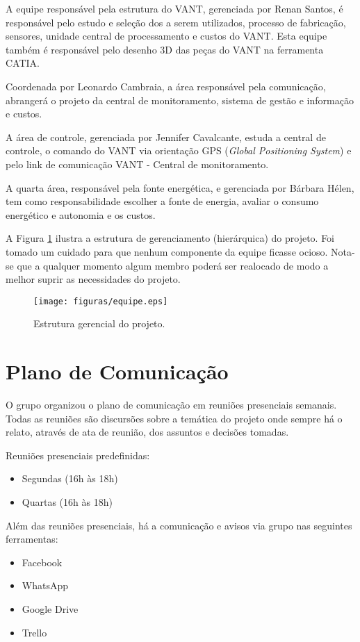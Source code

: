 A equipe responsável pela estrutura do VANT, gerenciada por Renan Santos, é responsável pelo estudo e seleção dos a serem utilizados, processo de fabricação, sensores, unidade central de processamento e custos do VANT. Esta equipe também é responsável pelo desenho 3D das peças do VANT na ferramenta CATIA.  
	
Coordenada por Leonardo Cambraia, a área responsável pela comunicação, abrangerá o projeto da central de monitoramento, sistema de gestão e informação e custos.
	
A área de controle, gerenciada por Jennifer Cavalcante, estuda a central de controle, o comando do VANT via orientação GPS (\textit{Global Positioning System}) e pelo link de comunicação VANT - Central de monitoramento.
	
A quarta área, responsável pela fonte energética, e gerenciada por Bárbara Hélen, tem como responsabilidade escolher a fonte de energia, avaliar o consumo energético e autonomia e os custos.
	
A Figura \ref{fig:equipe} ilustra a estrutura de gerenciamento (hierárquica) do projeto. Foi tomado um cuidado para que nenhum componente da equipe ficasse ocioso. Nota-se que a qualquer momento algum membro poderá ser realocado de modo a melhor suprir as necessidades do projeto.

\begin{figure}[H]
	\centering
		\texttt{[image: figuras/equipe.eps]}
	\caption{Estrutura gerencial do projeto.}
	\label{fig:equipe}
\end{figure}

\section{Plano de Comunicação}
O grupo organizou o plano de comunicação em reuniões presenciais semanais. Todas as reuniões são discursões sobre a temática do projeto onde sempre há o relato, através de ata de reunião, dos assuntos e decisões tomadas. 

Reuniões presenciais predefinidas:
\begin{itemize}
	\item Segundas (16h às 18h)
	\item Quartas (16h às 18h)
\end{itemize}

Além das reuniões presenciais, há a comunicação e avisos via grupo nas seguintes ferramentas:
\begin{itemize}
	\item Facebook
	\item WhatsApp
	\item Google Drive
	\item Trello
\end{itemize}

